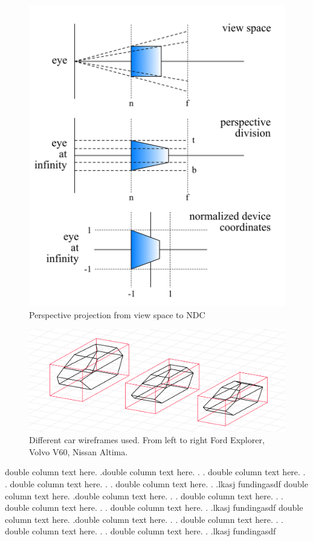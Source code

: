 \documentclass[conference]{IEEEtran}
\begin{document}
\begin{figure}
    \centering
    \includegraphics[width=0.8\columnwidth]{./images/view_coordinates_to_ndc.png}
    \caption{Perspective projection from view space to NDC}
    \label{img:view_to_ndc}
\end{figure}

\begin{figure}
    \centering
    \includegraphics[width=0.7\columnwidth]{./images/wireframes.png}
    \caption{Different car wireframes used. From left to right Ford Explorer, Volvo V60, Nissan Altima.}
    \label{img:wireframes}
\end{figure}

double column text here. .double column text here. . .
double column text here. . .
double column text here. . .
double column text here. . .lkasj fundingasdf
double column text here. .double column text here. . .
double column text here. . .
double column text here. . .
double column text here. . .lkasj fundingasdf
double column text here. .double column text here. . .
double column text here. . .
double column text here. . .
double column text here. . .lkasj fundingasdf
\end{document}
